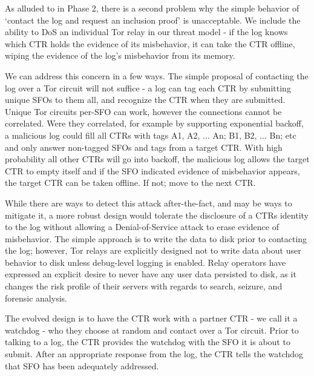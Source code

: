 As alluded to in Phase 2, there is a second problem why the simple behavior of
`contact the log and request an inclusion proof' is unacceptable. We include
the ability to DoS an individual Tor relay in our threat model - if the log
knows which CTR holds the evidence of its misbehavior, it can take the CTR
offline, wiping the evidence of the log's misbehavior from its memory. 

We can address this concern in a few ways. The simple proposal of contacting
the log over a Tor circuit will not suffice - a log can tag each CTR by
submitting unique SFOs to them all, and recognize the CTR when they are
submitted. Unique Tor circuits per-SFO can work, however the connections
cannot be correlated. Were they correlated, for example by supporting
exponential backoff, a malicious log could fill all CTRs with tags A1, A2, ... An;
B1, B2, ... Bn; etc and only answer non-tagged SFOs and tags from a target
CTR. With high probability all other CTRs will go into backoff, the malicious log
allows the target CTR to empty itself and if the SFO indicated evidence of
misbehavior appears, the target CTR can be taken offline. If not; move to the
next CTR. 

While there are ways to detect this attack after-the-fact, and may be ways to mitigate
it, a more robust design would tolerate the disclosure of a CTRs identity to the log
without allowing a Denial-of-Service attack to erase evidence of misbehavior.  The
simple approach is to write the data to disk prior to contacting the log; however, Tor relays
are explicitly designed not to write data about user behavior to disk unless
debug-level logging is enabled. Relay operators have expressed an explicit desire
to never have any user data persisted to disk, as it changes the risk profile of
their servers with regards to search, seizure, and forensic analysis.

The evolved design is to have the CTR work with a partner CTR - we call it
a watchdog - who they choose at random and contact over a Tor circuit. Prior to talking
to a log, the CTR provides the watchdog with the SFO it is about to submit. After
an appropriate response from the log, the CTR tells the watchdog that SFO has been
adequately addressed.

